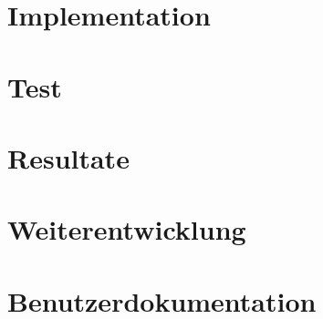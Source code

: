 \section{Implementation}

\section{Test}

\section{Resultate}

\section{Weiterentwicklung}

\section{Benutzerdokumentation}
